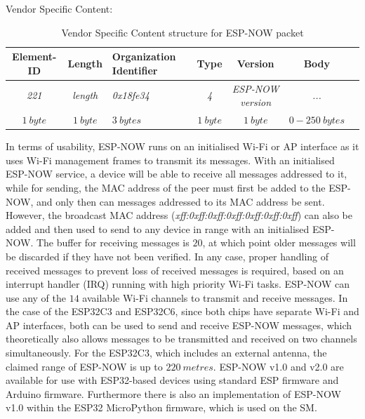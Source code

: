 \begin{table}[H]
    \centering
    Vendor Specific Content:
    \begin{tabular}{|c|c|p{70pt}|c|c|c|c|}
        \hline
        \textbf{Element-ID} & \textbf{Length} & \textbf{Organization Identifier} & \textbf{Type} & \textbf{Version} & \textbf{Body} \\
        \hline\hline
        \textit{221} & \textit{length} & \textit{0x18fe34} & \textit{4} & \textit{ESP-NOW version} & \textit{...} \\
        \hline\hline
        $1\ byte$ & $1\ byte$ & $3\ bytes$ & $1\ byte$ & $1\ byte$ & $0-250\ bytes$ \\
        \hline
    \end{tabular}
    \vspace{\ftspace}
    \caption{Vendor Specific Content structure for ESP-NOW packet \citep[adapted from][]{espressif_systems_esp-now_nodate}}
    \label{tab:vendorpecificcontent}
\end{table}

In terms of usability, ESP-NOW runs on an initialised Wi-Fi or AP interface as it uses Wi-Fi management frames to transmit its messages. With an initialised ESP-NOW service, a device will be able to receive all messages addressed to it, while for sending, the MAC address of the peer must first be added to the ESP-NOW, and only then can messages addressed to its MAC address be sent. However, the broadcast MAC address (\textit{xff:0xff:0xff:0xff:0xff:0xff:0xff}) can also be added and then used to send to any device in range with an initialised ESP-NOW.  The buffer for receiving messages is $20$, at which point older messages will be discarded if they have not been verified. In any case, proper handling of received messages to prevent loss of received messages is required, based on an interrupt handler (IRQ) running with high priority Wi-Fi tasks. ESP-NOW can use any of the $14$ available Wi-Fi channels to transmit and receive messages. In the case of the ESP32C3 and ESP32C6, since both chips have separate Wi-Fi and AP interfaces, both can be used to send and receive ESP-NOW messages, which theoretically also allows messages to be transmitted and received on two channels simultaneously. For the ESP32C3, which includes an external antenna, the claimed range of ESP-NOW is up to $220\ metres$. ESP-NOW v1.0 and v2.0 are available for use with ESP32-based devices using standard ESP firmware and Arduino firmware. Furthermore there is also an implementation of ESP-NOW v1.0 within the ESP32 MicroPython firmware, which is used on the SM. \citep{espressif_systems_esp-now_nodate, micropython_micropython_2025}\\

